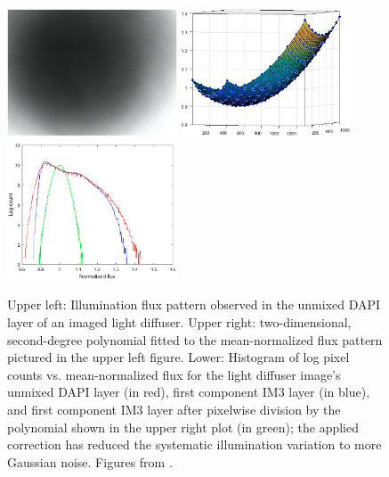 \documentclass[letterpaper,11pt]{article}
\begin{document}
\begin{figure}[!ht]
\centering
\includegraphics[width=0.45\textwidth]{images/introduction/first_unmixed_DAPI_meanimage}
\includegraphics[width=0.45\textwidth]{images/introduction/first_DAPI_meanimage_polynomial_fit}
\includegraphics[width=0.45\textwidth]{images/introduction/first_DAPI_meanimage_corrected_flux}
\caption{\footnotesize Upper left: Illumination flux pattern observed in the unmixed DAPI layer of an imaged light diffuser. Upper right: two-dimensional, second-degree polynomial fitted to the mean-normalized flux pattern pictured in the upper left figure. Lower: Histogram of log pixel counts vs. mean-normalized flux for the light diffuser image's unmixed DAPI layer (in red), first component IM3 layer (in blue), and first component IM3 layer after pixelwise division by the polynomial shown in the upper right plot (in green); the applied correction has reduced the systematic illumination variation to more Gaussian noise. Figures from \cite{Alex_flatfielding_1}.}
\label{fig:first_flatfielding}
\end{figure}
\end{document}
